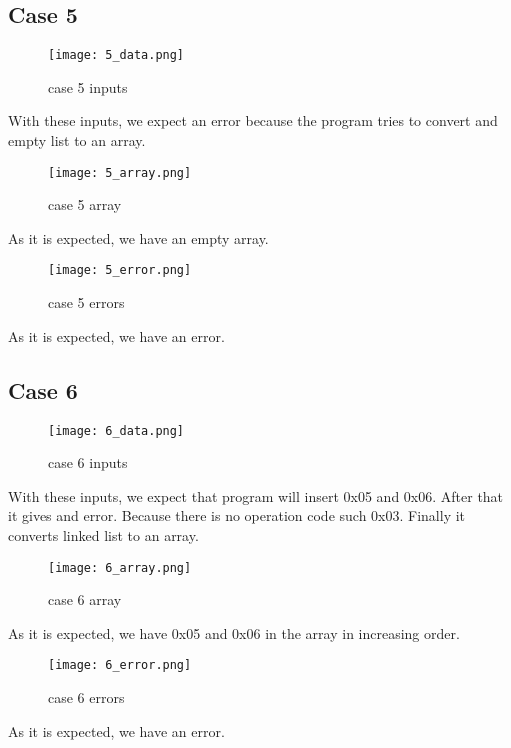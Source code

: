 \documentclass[pdftex,12pt,a4paper]{article}
\begin{document}
\subsection{Case 5}
\begin{figure}[H]
	\centering
	\texttt{[image: 5\_data.png]}
	\caption{case 5 inputs}
	\label{}
\end{figure}
With these inputs, we expect an error because the program tries to convert and empty list to an array.
\begin{figure}[H]
	\centering
	\texttt{[image: 5\_array.png]}
	\caption{case 5 array}
	\label{}
\end{figure}
As it is expected, we have an empty array.
\begin{figure}[H]
	\centering
	\texttt{[image: 5\_error.png]}
	\caption{case 5 errors}
	\label{}
\end{figure}
As it is expected, we have an error.

\subsection{Case 6}
\begin{figure}[H]
	\centering
	\texttt{[image: 6\_data.png]}
	\caption{case 6 inputs}
	\label{}
\end{figure}
With these inputs, we expect that program will insert 0x05 and 0x06. After that it gives and error. Because there is no operation code such 0x03. Finally it converts linked list to an array.
\begin{figure}[H]
	\centering
	\texttt{[image: 6\_array.png]}
	\caption{case 6 array}
	\label{}
\end{figure}
As it is expected, we have 0x05 and 0x06 in the array in increasing order.
\begin{figure}[H]
	\centering
	\texttt{[image: 6\_error.png]}
	\caption{case 6 errors}
	\label{}
\end{figure}
As it is expected, we have an error.
\end{document}

